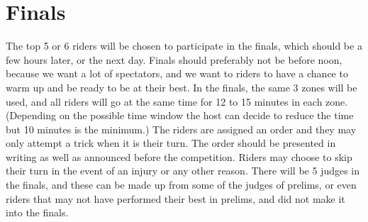 \section{Finals}
The top 5 or 6 riders will be chosen to participate in the finals, which should be a few hours later, or the next day.
Finals should preferably not be before noon, because we want a lot of spectators, and we want to riders to have a chance to warm up and be ready to be at their best.
In the finals, the same 3 zones will be used, and all riders will go at the same time for 12 to 15 minutes in each zone.
(Depending on the possible time window the host can decide to reduce the time but 10 minutes is the minimum.)
The riders are assigned an order and they may only attempt a trick when it is their turn.
The order should be presented in writing as well as announced before the competition.
Riders may choose to skip their turn in the event of an injury or any other reason.
There will be 5 judges in the finals, and these can be made up from some of the judges of prelims, or even riders that may not have performed their best in prelims, and did not make it into the finals.
